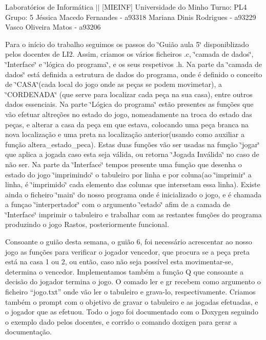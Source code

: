 Laboratórios de Informática $\vert$$\vert$ \mbox{[}M\+I\+E\+I\+NF\mbox{]} Universidade do Minho Turno\+: P\+L4 Grupo\+: 5 Jéssica Macedo Fernandes -\/ a93318 Mariana Dinis Rodrigues -\/ a93229 Vasco Oliveira Matos -\/ a93206

Para o início do trabalho seguimos os passos do \char`\"{}\+Guião aula 5\char`\"{} disponiblizado pelos docentes de L\+I2. Assim, criamos os vários ficheiros .c, \char`\"{}camada de dados\char`\"{}, \char`\"{}\+Interface\char`\"{} e \char`\"{}lógica do programa\char`\"{}, e os seus respetivos .h. Na parte da \char`\"{}camada de dados\char`\"{} está definida a estrutura de dados do programa, onde é definido o conceito de \char`\"{}\+C\+A\+S\+A\char`\"{}(cada local do jogo onde as peças se podem movimetar), a \char`\"{}\+C\+O\+R\+D\+E\+N\+A\+D\+A\char`\"{} (que serve para localizar cada peça na sua casa), entre outros dados essenciais. Na parte \char`\"{}\+Lógica do programa\char`\"{} estão presentes as funções que vão efetuar altreções no estado do jogo, nomeadamente na troca do estado das peças, e alterar a casa da peça em que estava, colocando uma peça branca na nova localização e uma preta na localização anterior(usando como auxiliar a função altera\+\_\+estado\+\_\+peca). Estas duas funções vão ser usadas na função \char`\"{}jogar\char`\"{} que aplica a jogada caso esta seja válida, ou retorna \char`\"{}\+Jogada Inválida\char`\"{} no caso de não ser. Na parte da \char`\"{}\+Interface\char`\"{} tempos presente uma função que desenha o estado do jogo \char`\"{}imprimindo\char`\"{} o tabuleiro por linha e por coluna(ao \char`\"{}imprimir\char`\"{} a linha, é \char`\"{}imprimido\char`\"{} cada elemento das colunas que intersetam essa linha). Existe ainda o ficheiro \char`\"{}main\char`\"{} do nosso programa onde é inicializado o jogo, e é chamada a funçao \char`\"{}interpertador\char`\"{} com o argumento \char`\"{}estado\char`\"{} afim de a camada de \char`\"{}\+Interface\char`\"{} imprimir o tabuleiro e trabalhar com as restantes funções do programa produzindo o jogo Rastos, posteriormente funcional.

Consoante o guião desta semana, o guião 6, foi necessário acrescentar ao nosso jogo as funções para verificar o jogador vencedor, que procura se a peça preta está na casa 1 ou 2, ou então, caso não seja possível esta movimentar-\/se, determina o vencedor. Implementamos também a função Q que consoante a decisão do jogador termina o jogo. O comado ler e gr recebem como argumento o ficheiro “jogo.\+txt” onde vão ler o tabuleiro e grava-\/lo, respectivamente. Criamos também o prompt com o objetivo de gravar o tabuleiro e as jogadas efetuadas, e o jogador que as efetuou. Todo o jogo foi documentado com o Doxygen seguindo o exemplo dado pelos docentes, e corrido o comando doxigen para gerar a documentação. 